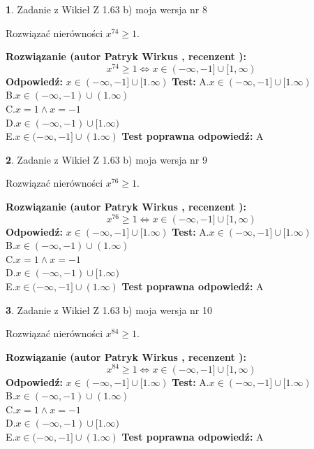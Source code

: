 \documentclass[12pt, a4paper]{article}
\theoremstyle{definition} %
\newtheorem{zad}{}
\newcommand{\zadStart}[1]{\begin{zad}#1\newline}
\newcommand{\zadStop}{\end{zad}}
\newcommand{\rozwStart}[2]{\noindent \textbf{Rozwiązanie (autor #1 , recenzent #2): }\newline}
\newcommand{\rozwStop}{\newline}
\newcommand{\odpStart}{\noindent \textbf{Odpowiedź:}\newline}
\newcommand{\odpStop}{\newline}
\newcommand{\testStart}{\noindent \textbf{Test:}\newline}
\newcommand{\testStop}{\newline}
\newcommand{\kluczStart}{\noindent \textbf{Test poprawna odpowiedź:}\newline}
\newcommand{\kluczStop}{\newline}
\begin{document}
\zadStart{Zadanie z Wikieł Z 1.63 b) moja wersja nr 8}

Rozwiązać nierówności $x^{74} \ge 1$.
\zadStop
\rozwStart{Patryk Wirkus}{}
$$x^{74} \ge 1 \iff x \in (-\infty,-1] \cup [1,\infty)$$
\rozwStop
\odpStart
$x \in (-\infty,-1] \cup [1.\infty)$
\odpStop
\testStart
A.$x \in (-\infty,-1] \cup [1.\infty)$\\ B.$x \in (-\infty,-1) \cup (1.\infty)$\\ C.$x = 1 \wedge x = -1$\\ D.$x \in (-\infty,-1) \cup [1.\infty)$\\ E.$x \in (-\infty,-1] \cup (1.\infty)$
\testStop
\kluczStart
A
\kluczStop



\zadStart{Zadanie z Wikieł Z 1.63 b) moja wersja nr 9}

Rozwiązać nierówności $x^{76} \ge 1$.
\zadStop
\rozwStart{Patryk Wirkus}{}
$$x^{76} \ge 1 \iff x \in (-\infty,-1] \cup [1,\infty)$$
\rozwStop
\odpStart
$x \in (-\infty,-1] \cup [1.\infty)$
\odpStop
\testStart
A.$x \in (-\infty,-1] \cup [1.\infty)$\\ B.$x \in (-\infty,-1) \cup (1.\infty)$\\ C.$x = 1 \wedge x = -1$\\ D.$x \in (-\infty,-1) \cup [1.\infty)$\\ E.$x \in (-\infty,-1] \cup (1.\infty)$
\testStop
\kluczStart
A
\kluczStop



\zadStart{Zadanie z Wikieł Z 1.63 b) moja wersja nr 10}

Rozwiązać nierówności $x^{84} \ge 1$.
\zadStop
\rozwStart{Patryk Wirkus}{}
$$x^{84} \ge 1 \iff x \in (-\infty,-1] \cup [1,\infty)$$
\rozwStop
\odpStart
$x \in (-\infty,-1] \cup [1.\infty)$
\odpStop
\testStart
A.$x \in (-\infty,-1] \cup [1.\infty)$\\ B.$x \in (-\infty,-1) \cup (1.\infty)$\\ C.$x = 1 \wedge x = -1$\\ D.$x \in (-\infty,-1) \cup [1.\infty)$\\ E.$x \in (-\infty,-1] \cup (1.\infty)$
\testStop
\kluczStart
A
\kluczStop
\end{document}
